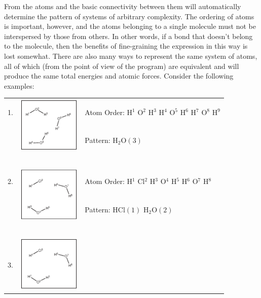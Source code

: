 From the atoms and the basic connectivity between them \progname{} will automatically determine the pattern of systems of arbitrary complexity. The ordering of atoms is important, however, and the atoms belonging to a single molecule must not be interspersed by those from others. In other words, if a bond  that doesn't belong to the molecule, then the benefits of fine-graining the expression in this way is lost somewhat. There are also many ways to represent the same system of atoms, all of which (from the point of view of the program) are equivalent and will produce the same total energies and atomic forces. Consider the following examples:

\begin{table}
\centering
\begin{tabular}{c c l}
	1. & \multirow{2}{*}{ \includegraphics[width=3cm]{figures/pattern1.eps} } &
		Atom Order: H$^1$ O$^2$ H$^3$ H$^4$ O$^5$ H$^6$ H$^7$ O$^8$ H$^9$ \\
		& & Pattern: H$_2$O$(3)$ \\\\\\\\\\\\
	2. & \multirow{2}{*}{ \includegraphics[width=3cm]{figures/pattern2.eps} } &
		Atom Order: H$^1$ Cl$^2$ H$^3$ O$^4$ H$^5$ H$^6$ O$^7$ H$^8$ \\
		& & Pattern: HCl$(1)$ H$_2$O$(2)$ \\\\\\\\\\\\
	3. & \multirow{2}{*}{ \includegraphics[width=3cm]{figures/pattern3.eps} } &

\end{tabular}
\end{table}
